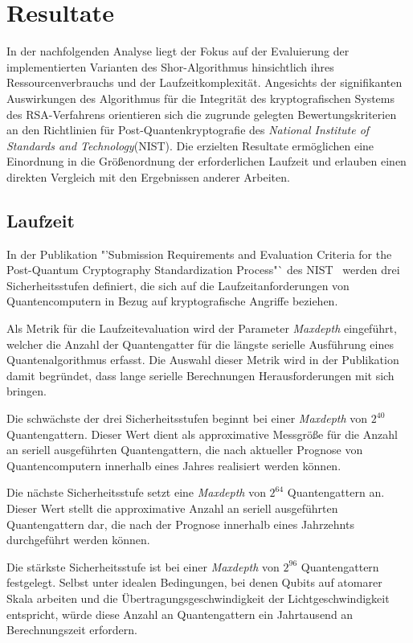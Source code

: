 \section{Resultate}
In der nachfolgenden Analyse liegt der Fokus auf der Evaluierung der implementierten Varianten des Shor-Algorithmus hinsichtlich ihres Ressourcenverbrauchs und 
der Laufzeitkomplexität. 
Angesichts der signifikanten Auswirkungen des Algorithmus für die Integrität des kryptografischen Systems des RSA-Verfahrens  
orientieren sich die zugrunde gelegten Bewertungskriterien an den Richtlinien für Post-Quantenkryptografie des \textit{National Institute of Standards and Technology}(NIST). 
Die erzielten Resultate ermöglichen eine Einordnung in die Größenordnung der erforderlichen Laufzeit und 
erlauben einen direkten Vergleich mit den Ergebnissen anderer Arbeiten.

\subsection*{Laufzeit}
In der Publikation "'Submission Requirements and Evaluation Criteria for the Post-Quantum Cryptography Standardization Process"` des NIST~\cite[17]{NISTPQC} 
werden drei Sicherheitsstufen definiert, die sich auf die Laufzeitanforderungen von Quantencomputern in Bezug auf kryptografische Angriffe beziehen.

Als Metrik für die Laufzeitevaluation wird der Parameter \textit{Maxdepth} eingeführt, 
welcher die Anzahl der Quantengatter für die längste serielle Ausführung eines Quantenalgorithmus erfasst.
Die Auswahl dieser Metrik wird in der Publikation damit begründet, dass lange serielle Berechnungen Herausforderungen mit sich bringen.

Die schwächste der drei Sicherheitsstufen beginnt bei einer \textit{Maxdepth} von \(2^{40}\) Quantengattern. 
Dieser Wert dient als approximative Messgröße für die Anzahl an seriell ausgeführten Quantengattern, 
die nach aktueller Prognose von Quantencomputern innerhalb eines Jahres realisiert werden können.

Die nächste Sicherheitsstufe setzt eine \textit{Maxdepth} von \(2^{64}\) Quantengattern an.
Dieser Wert stellt die approximative Anzahl an seriell ausgeführten Quantengattern dar, 
die nach der Prognose innerhalb eines Jahrzehnts durchgeführt werden können.

Die stärkste Sicherheitsstufe ist bei einer \textit{Maxdepth} von \(2^{96}\) Quantengattern festgelegt. 
Selbst unter idealen Bedingungen, 
bei denen Qubits auf atomarer Skala arbeiten und die Übertragungsgeschwindigkeit der Lichtgeschwindigkeit entspricht, 
würde diese Anzahl an Quantengattern ein Jahrtausend an Berechnungszeit erfordern.


